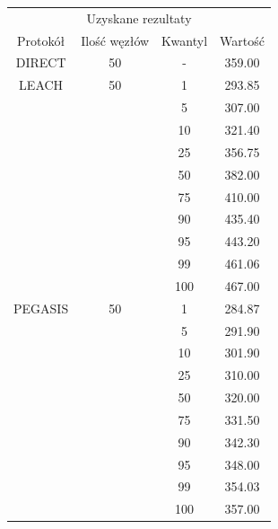 \documentclass[a4paper,12pt,twoside,openany]{report}
\begin{document}
\begin{longtable}{*{4}{c}}
\toprule
\multicolumn{4}{c}{Uzyskane rezultaty} \\
Protokół	& Ilość węzłów	& Kwantyl	& Wartość \\
\midrule
\endhead
DIRECT	& 50 	& -	& 359.00 \\*
\midrule
LEACH	& 50	& 1	& 293.85 \\*
	&	& 5	& 307.00 \\*
	&	& 10	& 321.40 \\*
	&	& 25	& 356.75 \\*
	&	& 50	& 382.00 \\*
	&	& 75	& 410.00 \\*
	&	& 90	& 435.40 \\*
	&	& 95	& 443.20 \\*
	&	& 99	& 461.06 \\*
	&	& 100	& 467.00 \\*
\midrule
PEGASIS	& 50	& 1	& 284.87 \\*
	&	& 5	& 291.90 \\*
	&	& 10	& 301.90 \\*
	&	& 25	& 310.00 \\*
	&	& 50	& 320.00 \\*
	&	& 75	& 331.50 \\*
	&	& 90	& 342.30 \\*
	&	& 95	& 348.00 \\*
	&	& 99	& 354.03 \\*
	&	& 100	& 357.00 \\*
\bottomrule
\end{longtable}
\end{document}
